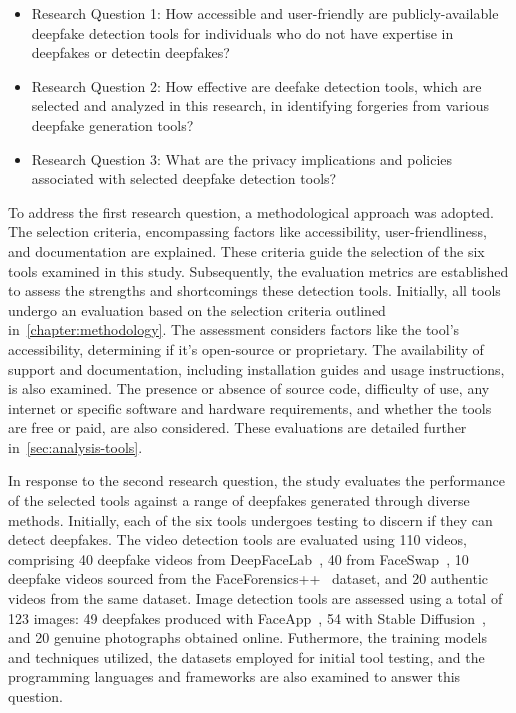 \begin{itemize}
	\item Research Question 1: How accessible and user-friendly are publicly-available
	      deepfake detection tools for individuals who do not have expertise in deepfakes or
	      detectin deepfakes?
	\item Research Question 2: How effective are deefake detection tools, which are selected
	      and analyzed in this research, in identifying forgeries from various deepfake
	      generation tools?
	\item Research Question 3: What are the privacy implications and policies associated with
	      selected deepfake detection tools?
\end{itemize}

To address the first research question, a methodological approach was adopted. The selection
criteria, encompassing factors like accessibility, user-friendliness, and documentation
are explained. These criteria guide the selection of the six tools examined in this study.
Subsequently, the evaluation metrics are established to assess the strengths and shortcomings
these detection tools. Initially, all tools undergo an evaluation based on the selection
criteria outlined in~\autoref{chapter:methodology}. The assessment considers factors like
the tool's accessibility, determining if it's open-source or proprietary. The availability
of support and documentation, including installation guides and usage instructions, is also
examined. The presence or absence of source code, difficulty of use, any internet or
specific software and hardware requirements, and whether the tools are free or paid,
are also considered. These evaluations are detailed further in~\autoref{sec:analysis-tools}.

In response to the second research question, the study evaluates the performance of the
selected tools against a range of deepfakes generated through diverse methods. Initially,
each of the six tools undergoes testing to discern if they can detect deepfakes. The video
detection tools are evaluated using 110 videos, comprising 40 deepfake videos from
DeepFaceLab~\cite{perov2021deepfacelab}, 40 from FaceSwap~\cite{faceswap}, 10 deepfake
videos sourced from the FaceForensics++~\cite{roessler2019faceforensicspp} dataset,
and 20 authentic videos from the same dataset. Image detection tools are assessed using a
total of 123 images: 49 deepfakes produced with FaceApp~\cite{faceapp-app},
54 with Stable Diffusion~\cite{stable-diffusion}, and 20 genuine photographs obtained online.
Futhermore, the training models and techniques utilized, the datasets employed for initial tool
testing, and the programming languages and frameworks are also examined to answer this question.

